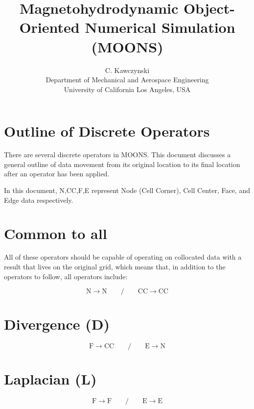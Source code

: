 \documentclass[11pt]{article}
\begin{document}
\doublespacing
\title{Magnetohydrodynamic Object-Oriented Numerical Simulation (MOONS)}
\author{C. Kawczynski \\
Department of Mechanical and Aerospace Engineering \\
University of California Los Angeles, USA\\
}
\maketitle

\section{Outline of Discrete Operators}

There are several discrete operators in MOONS. This document discusses a general outline of data movement from its original location to its final location after an operator has been applied.

In this document, N,CC,F,E represent Node (Cell Corner), Cell Center, Face, and Edge data respectively.

\section{Common to all}

All of these operators should be capable of operating on collocated data with a result that lives on the original grid, which means that, in addition to the operators to follow, all operators include:

\begin{equation}
	\text{N} \rightarrow \text{N} 
	\qquad / \qquad 
	\text{CC} \rightarrow \text{CC}
\end{equation}


\section{Divergence (D)}

\begin{equation}
	\text{F} \rightarrow \text{CC}
	\qquad / \qquad 
	\text{E} \rightarrow \text{N}
\end{equation}

\section{Laplacian (L)}

\begin{equation}
	\text{F} \rightarrow \text{F}
	\qquad / \qquad 
	\text{E} \rightarrow \text{E}
\end{equation}
\end{document}
